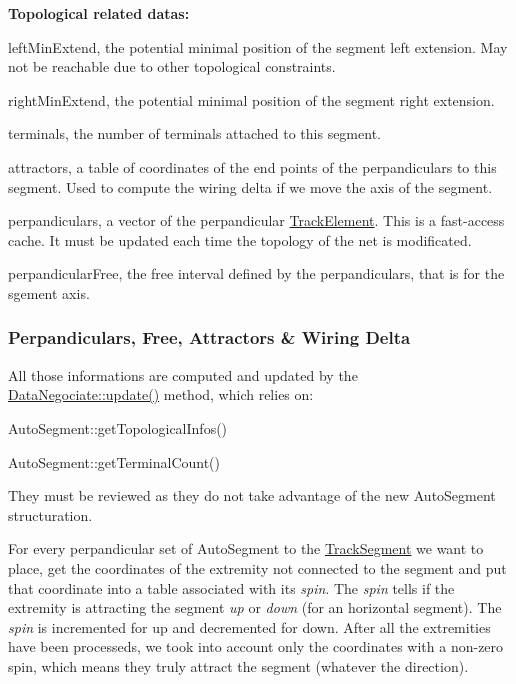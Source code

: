 {\bfseries Topological related datas\+:}
\begin{DoxyItemize}
\item {\ttfamily left\+Min\+Extend}, the potential minimal position of the segment left extension. May not be reachable due to other topological constraints.
\item {\ttfamily right\+Min\+Extend}, the potential minimal position of the segment right extension.
\item {\ttfamily terminals}, the number of terminals attached to this segment.
\item {\ttfamily attractors}, a table of coordinates of the end points of the perpandiculars to this segment. Used to compute the wiring delta if we move the axis of the segment.
\item {\ttfamily perpandiculars}, a {\ttfamily vector} of the perpandicular \mbox{\hyperlink{classKite_1_1TrackElement}{Track\+Element}}. This is a fast-\/access cache. It must be updated each time the topology of the net is modificated.
\item {\ttfamily perpandicular\+Free}, the free interval defined by the perpandiculars, that is for the sgement axis.
\end{DoxyItemize}\hypertarget{classKite_1_1DataNegociate_secAttractorsComputation}{}\subsubsection{Perpandiculars, Free, Attractors \& Wiring Delta}\label{classKite_1_1DataNegociate_secAttractorsComputation}
All those informations are computed and updated by the \mbox{\hyperlink{classKite_1_1DataNegociate_ac5c54df7ed3b930268c8d7752c101725}{Data\+Negociate\+::update()}} method, which relies on\+:
\begin{DoxyItemize}
\item Auto\+Segment\+::get\+Topological\+Infos()
\item Auto\+Segment\+::get\+Terminal\+Count()
\end{DoxyItemize}

They must be reviewed as they do not take advantage of the new Auto\+Segment structuration.

For every perpandicular set of Auto\+Segment to the \mbox{\hyperlink{classKite_1_1TrackSegment}{Track\+Segment}} we want to place, get the coordinates of the extremity not connected to the segment and put that coordinate into a table associated with it\textquotesingle{}s {\itshape spin}. The {\itshape spin} tells if the extremity is attracting the segment {\itshape up} or {\itshape down} (for an horizontal segment). The {\itshape spin} is incremented for up and decremented for down. After all the extremities have been processeds, we took into account only the coordinates with a non-\/zero spin, which means they truly attract the segment (whatever the direction).

